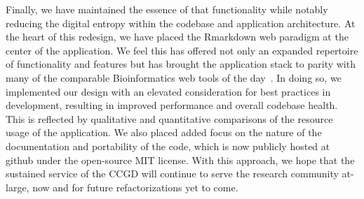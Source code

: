 \documentclass[10pt]{report}
\begin{document}
Finally, we have maintained the essence of that functionality while notably reducing the digital entropy within the codebase and application architecture. At the heart of this redesign, we have placed the Rmarkdown web paradigm at the center of the application. We feel this has offered not only an expanded repertoire of functionality and features but has brought the application stack to parity with many of the comparable Bioinformatics web tools of the day~\cite{zhengComprehensiveReviewWeb2020a}. In doing so, we implemented our design with an elevated consideration for best practices in development, resulting in improved performance and overall codebase health. This is reflected by qualitative and quantitative comparisons of the resource usage of the application. We also placed added focus on the nature of the documentation and portability of the code, which is now publicly hosted at github under the open-source MIT license. With this approach, we hope that the sustained service of the CCGD will continue to serve the research community at-large, now and for future refactorizations yet to come.

\nocite{*}
\printbibliography{}
\end{document}
